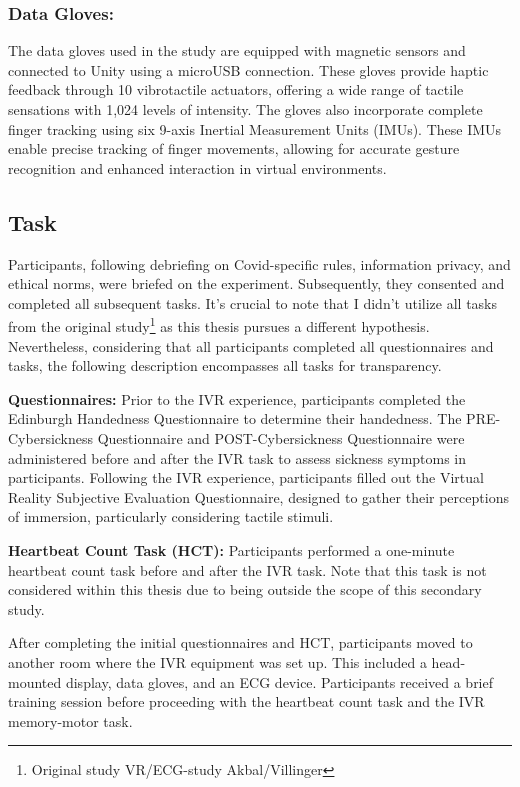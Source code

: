 \documentclass[12pt,oneside,openright]{report}
\begin{document}
\subsubsection*{Data Gloves:}
The data gloves used in the study are equipped with magnetic sensors and connected to Unity using a microUSB connection. These gloves provide haptic feedback through 10 vibrotactile actuators, offering a wide range of tactile sensations with 1,024 levels of intensity. The gloves also incorporate complete finger tracking using six 9-axis Inertial Measurement Units (IMUs). These IMUs enable precise tracking of finger movements, allowing for accurate gesture recognition and enhanced interaction in virtual environments.


\subsection*{Task}

Participants, following debriefing on Covid-specific rules, information privacy, and ethical norms, were briefed on the experiment. Subsequently, they consented and completed all subsequent tasks. It's crucial to note that I didn't utilize all tasks from the original study\footnote{Original study VR/ECG-study Akbal/Villinger} as this thesis pursues a different hypothesis. Nevertheless, considering that all participants completed all questionnaires and tasks, the following description encompasses all tasks for transparency.

\textbf{Questionnaires:} Prior to the IVR experience, participants completed the Edinburgh Handedness Questionnaire to determine their handedness. The PRE-Cybersickness Questionnaire and POST-Cybersickness Questionnaire were administered before and after the IVR task to assess sickness symptoms in participants. Following the IVR experience, participants filled out the Virtual Reality Subjective Evaluation Questionnaire, designed to gather their perceptions of immersion, particularly considering tactile stimuli. 

\textbf{Heartbeat Count Task (HCT):} Participants performed a one-minute heartbeat count task before and after the IVR task. Note that this task is not considered within this thesis due to being outside the scope of this secondary study.

After completing the initial questionnaires and HCT, participants moved to another room where the IVR equipment was set up. This included a head-mounted display, data gloves, and an ECG device. Participants received a brief training session before proceeding with the heartbeat count task and the IVR memory-motor task.
\end{document}
